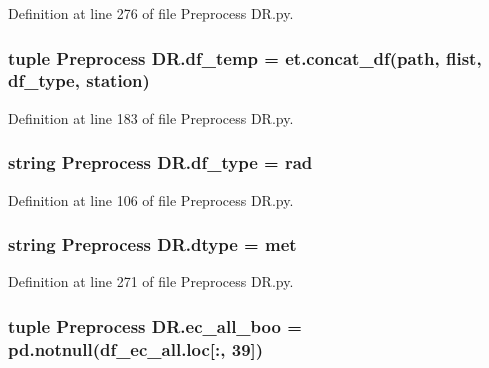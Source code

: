 Definition at line 276 of file Preprocess D\+R.\+py.

\hypertarget{namespace_preprocess_01_d_r_a8170ab278e5e65c4c35be6d3eaa3f5b9}{}
\subsubsection[{df\+\_\+temp}]{\setlength{\rightskip}{0pt plus 5cm}tuple Preprocess D\+R.\+df\+\_\+temp = et.\+concat\+\_\+df({\bf path}, {\bf flist}, {\bf df\+\_\+type}, {\bf station})}\label{namespace_preprocess_01_d_r_a8170ab278e5e65c4c35be6d3eaa3f5b9}


Definition at line 183 of file Preprocess D\+R.\+py.

\hypertarget{namespace_preprocess_01_d_r_a8179dd2e8d60a0dc3d9dff36cc8ea97e}{}
\subsubsection[{df\+\_\+type}]{\setlength{\rightskip}{0pt plus 5cm}string Preprocess D\+R.\+df\+\_\+type = \textquotesingle{}rad\textquotesingle{}}\label{namespace_preprocess_01_d_r_a8179dd2e8d60a0dc3d9dff36cc8ea97e}


Definition at line 106 of file Preprocess D\+R.\+py.

\hypertarget{namespace_preprocess_01_d_r_aef77e329fc2c79a858516307ae919e76}{}
\subsubsection[{dtype}]{\setlength{\rightskip}{0pt plus 5cm}string Preprocess D\+R.\+dtype = \textquotesingle{}met\textquotesingle{}}\label{namespace_preprocess_01_d_r_aef77e329fc2c79a858516307ae919e76}


Definition at line 271 of file Preprocess D\+R.\+py.

\hypertarget{namespace_preprocess_01_d_r_a2ba8e3d62d3eedd973e7dcb3830a2445}{}
\subsubsection[{ec\+\_\+all\+\_\+boo}]{\setlength{\rightskip}{0pt plus 5cm}tuple Preprocess D\+R.\+ec\+\_\+all\+\_\+boo = pd.\+notnull(df\+\_\+ec\+\_\+all.\+loc\mbox{[}\+:, 39\mbox{]})}\label{namespace_preprocess_01_d_r_a2ba8e3d62d3eedd973e7dcb3830a2445}


